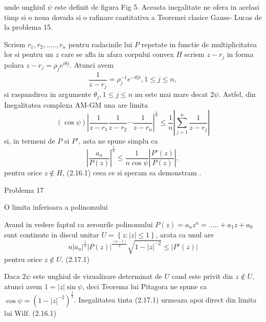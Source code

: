 \documentclass[a4paper,12pt,oneside]{report}
\begin{document}
unde unghiul \(\psi\) este definit de figura Fig 5. Aceasta inegalitate ne ofera in acelasi timp si o noua dovada si o rafinare cantitativa  a Teoremei clasice Gauss- Lucas de la problema 15. 

Scriem \(r_{1} , r_{2} ,.....,r_{n}\) pentru radacinile lui \(P\) repetate in functie de multiplicitatea lor si pentru un \(z\) care se afla in afara corpului convex \(H\) scriem \(z - r_{j}\) in forma polara \(z - r_{j} = \rho _{j}e^{i\theta j}\). Atunci avem 
\begin{displaymath}
  \frac{1}{z - r_{j}} = \rho _{j}^{-1}e^{-\theta ji} , 1 \leq  j \leq  n,
\end{displaymath}
si raspandirea in argumente \(\theta _{j}, 1 \leq j\leq n\) nu este mai mare decat \(2\psi\). Astfel, din Inegalitatea complexa AM-GM una are limita 
\begin{displaymath}
  \left ( \cos\psi  \right )\left | \frac{1}{z - r_{1}} \frac{1}{z - r_{2}}\cdots \frac{1}{z - r_{n}} \right|^{\frac{1}{n}} \leq  \frac{1}{n} \left | \sum_{j = 1}^{n}\frac{1}{z - r_{j}} \right |
\end{displaymath}
si, in termeni de \(P\) si \({P}'\), asta ne spune simplu ca 
\begin{displaymath}
   \left | \frac{a_{n}}{P\left ( z \right )} \right |^{\frac{1}{n}}\leq \frac{1}{n\cos\psi }\left | \frac{{P}'\left ( z \right )}{P\left ( z \right )} \right |,
\end{displaymath}
 pentru orice \(z \notin H\), (2.16.1) ceea ce si speram sa demonstram . 

Problema 17

O limita inferioara a polinomului 

Avand in vedere faptul ca zerourile polinomului \(P\left ( z \right ) = a_{n}z^{n} =.....+a_{1}z + a_{0}\) sunt continute in discul unitar \(U= \left \{ z: \left | z \right |\leq 1 \right \}\), arata ca unul are
\begin{displaymath}
    n\left | a_{n} \right |^{\frac{1}{n}}\left | P\left ( z \right ) \right |^{\frac{\left ( n-1 \right )}{n}}\sqrt{1 - \left | z \right |^{-2}}\leq \left | {P}'\left ( z \right ) \right |
\end{displaymath}
pentru orice \(z\notin U\). (2.17.1)

Daca \(2\psi\) este unghiul de vizualizare determinat de \(U\) cand este privit din \(z \notin U\), atunci avem \(1 = \left | z \right |\sin\psi\), deci Teorema lui Pitagora ne spune ca \(\cos\psi = \left ( 1 - \left | z \right |^{-2} \right )^{\frac{1}{2}}\). Inegalitatea tinta (2.17.1) urmeaza apoi direct din limita lui Wilf. (2.16.1)
\end{document}
